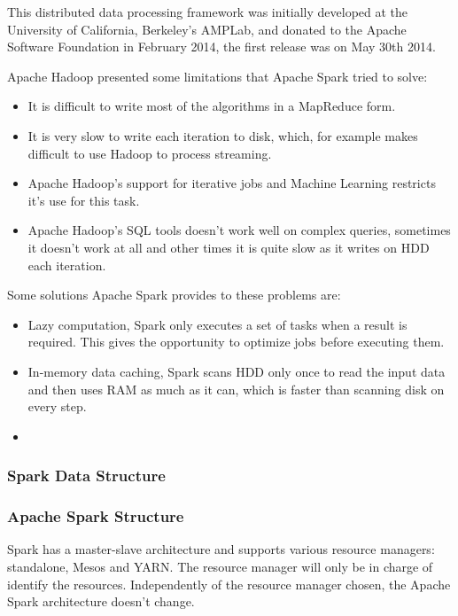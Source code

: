 \documentclass[11pt]{article} %
\begin{document}
    This distributed data processing framework was initially developed at the University of California, Berkeley's AMPLab, and donated to the Apache Software Foundation in February 2014, the first release was on May 30th 2014.

    Apache Hadoop presented some limitations that Apache Spark tried to solve:

    \begin{itemize}
      \item It is difficult to write most of the algorithms in a MapReduce form.
      \item It is very slow to write each iteration to disk, which, for example makes difficult to use Hadoop to process streaming.
      \item Apache Hadoop's support for iterative jobs and Machine Learning restricts it's use for this task.
      \item Apache Hadoop's SQL tools doesn't work well on complex queries, sometimes it doesn't work at all and other times it is quite slow as it writes on HDD each iteration.
    \end{itemize}

    Some solutions Apache Spark provides to these problems are:

    \begin{itemize}
      \item Lazy computation, Spark only executes a set of tasks when a result is required. This gives the opportunity to optimize jobs before executing them.
      \item In-memory data caching, Spark scans HDD only once to read the input data and then uses RAM as much as it can, which is faster than scanning disk on every step.
      \item
    \end{itemize}

    \subsubsection{Spark Data Structure}




    \subsubsection{Apache Spark Structure}

      Spark has a master-slave architecture and supports various resource managers: standalone, Mesos and YARN. The resource manager will only be in charge of identify the resources. Independently of the resource manager chosen, the Apache Spark architecture doesn't change.
\end{document}
